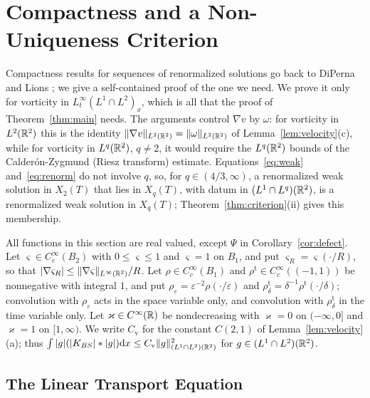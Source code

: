 \section{Compactness and a Non-Uniqueness Criterion}
\label{sec:compact}

Compactness results for sequences of renormalized solutions go back to DiPerna and Lions
\cite{DiPernaLions}; we give a self-contained proof of the one we need. We prove
it only for vorticity in $L^\infty_t(L^1\cap L^2)_x$, which is all that the proof
of Theorem~\ref{thm:main} needs. The arguments control $\nabla v$ by $\omega$:
for vorticity in $L^2(\mathbb{R}^2)$ this is the identity $\|\nabla v\|_{L^2(\mathbb{R}^2)}=\|\omega\|_{L^2(\mathbb{R}^2)}$
of Lemma~\ref{lem:velocity}(c), while for vorticity in $L^q(\mathbb{R}^2)$, $q\ne2$, it would
require the $L^q(\mathbb{R}^2)$ bounds of the Calder\'on-Zygmund (Riesz transform) estimate. Equations~\eqref{eq:weak}
and~\eqref{eq:renorm} do not involve $q$, so, for $q\in(4/3,\infty)$, a
renormalized weak solution in $X_2(T)$ that lies in $X_q(T)$, with datum in $(L^1\cap L^q)(\mathbb{R}^2)$, is a
renormalized weak solution in $X_q(T)$; Theorem~\ref{thm:criterion}(ii) gives
this membership.

All functions in this section are real valued, except $\Psi$ in
Corollary~\ref{cor:defect}. Let $\varsigma\in C_c^\infty(B_2)$ with
$0\le\varsigma\le1$ and $\varsigma=1$ on $B_1$, and put
$\varsigma_R=\varsigma(\cdot/R)$, so that
$|\nabla\varsigma_R|\le\|\nabla\varsigma\|_{L^\infty(\mathbb{R}^2)}/R$. Let
$\rho\in C_c^\infty(B_1)$ and $\rho^{\mathrm t}\in C_c^\infty((-1,1))$ be
nonnegative with integral $1$, and put
$\rho_\varepsilon=\varepsilon^{-2}\rho(\cdot/\varepsilon)$ and
$\rho^{\mathrm t}_\delta=\delta^{-1}\rho^{\mathrm t}(\cdot/\delta)$; convolution
with $\rho_\varepsilon$ acts in the space variable only, and convolution with
$\rho^{\mathrm t}_\delta$ in the time variable only. Let
$\varkappa\in C^\infty(\mathbb{R})$ be nondecreasing with $\varkappa=0$ on
$(-\infty,0]$ and $\varkappa=1$ on $[1,\infty)$. We write $C_{\mathrm v}$ for
the constant $C(2,1)$ of Lemma~\ref{lem:velocity}(a); thus
$\int|g|(|K_{BS}|\ast|g|)\dd x\le C_{\mathrm v}\|g\|_{(L^1\cap L^2)(\mathbb{R}^2)}^2$ for
$g\in (L^1\cap L^2)(\mathbb{R}^2)$.

\subsection{The Linear Transport Equation}

